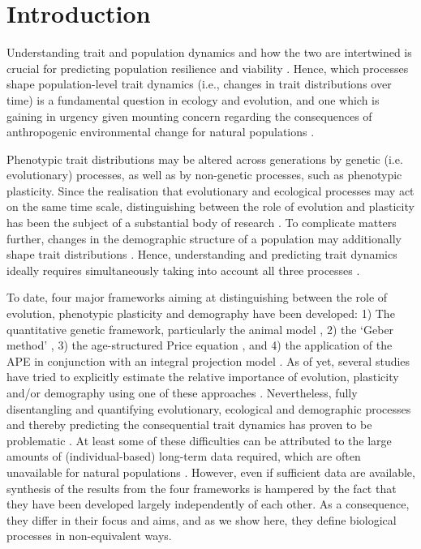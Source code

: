 \section{Introduction}


Understanding trait and population dynamics and how the two are intertwined is crucial for predicting population resilience and viability \parencite[e.g.][]{merila2014}. Hence, which processes shape population-level trait dynamics (i.e., changes in trait distributions over time) is a fundamental question in ecology and evolution, and one which is gaining in urgency given mounting concern regarding the consequences of anthropogenic environmental change for natural populations \parencite[e.g.][]{parmesan2006}.

Phenotypic trait distributions may be altered across generations by genetic (i.e. evolutionary) processes, as well as by non-genetic processes, such as phenotypic plasticity. Since the realisation that evolutionary and ecological processes may act on the same time scale, distinguishing between the role of evolution and plasticity has been the subject of a substantial body of research \parencite{Hairston2005,Gienapp2008,Post2009}. To complicate matters further, changes in the demographic structure of a population may additionally shape trait distributions \parencite{Coulson2008}. Hence, understanding and predicting trait dynamics ideally requires simultaneously taking into account all three processes \parencite{Pelletier2007,Schoener2011}. 

To date, four major frameworks aiming at distinguishing between the role of evolution, phenotypic plasticity and demography have been developed: 1) The quantitative genetic framework, particularly the animal model \parencite[AM; e.g.][]{Henderson1950}, 2) the `Geber method' \parencite[GM;][]{Hairston2005}, 3) the age-structured Price equation \parencite[APE;][]{Coulson2008}, and 4) the application of the APE in conjunction with an integral projection model \parencite[IPM;][]{easterling2000,Ellner2006,Coulson2010}. As of yet, several studies have tried to explicitly estimate the relative importance of evolution, plasticity and/or demography using one of these approaches \parencite[e.g.][]{Reale2003, Ezard2009, Ozgul2009, Rebke2010, Becks2012, Morrissey2012b}. Nevertheless, fully disentangling and quantifying evolutionary, ecological and demographic processes and thereby predicting the consequential trait dynamics has proven to be problematic \parencite{Gienapp2008,Schoener2011,merila2014}. At least some of these difficulties can be attributed to the large amounts of (individual-based) long-term data required, which are often unavailable for natural populations \parencite{Clutton-brock2010}. However, even if sufficient data are available, synthesis of the results from the four frameworks is hampered by the fact that they have been developed largely independently of each other. As a consequence, they differ in their focus and aims, and as we show here, they define biological processes in non-equivalent ways.  

